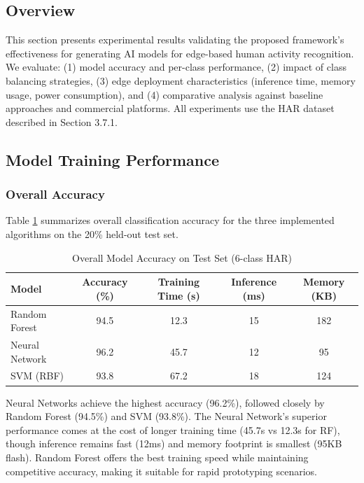 \subsection{Overview}
This section presents experimental results validating the proposed framework's effectiveness for generating AI models for edge-based human activity recognition. We evaluate: (1) model accuracy and per-class performance, (2) impact of class balancing strategies, (3) edge deployment characteristics (inference time, memory usage, power consumption), and (4) comparative analysis against baseline approaches and commercial platforms. All experiments use the HAR dataset described in Section 3.7.1.

\subsection{Model Training Performance}

\subsubsection{Overall Accuracy}
Table \ref{tab:model_accuracy} summarizes overall classification accuracy for the three implemented algorithms on the 20\% held-out test set.

\begin{table}[H]
    \centering
    \caption{Overall Model Accuracy on Test Set (6-class HAR)}
    \begin{tabular}{@{}lcccc@{}}
        \toprule
        Model & Accuracy (\%) & Training Time (s) & Inference (ms) & Memory (KB) \\ 
        \midrule
        Random Forest & 94.5 & 12.3 & 15 & 182 \\
        Neural Network & 96.2 & 45.7 & 12 & 95 \\
        SVM (RBF) & 93.8 & 67.2 & 18 & 124 \\ 
        \bottomrule
    \end{tabular}
    \label{tab:model_accuracy}
\end{table}

Neural Networks achieve the highest accuracy (96.2\%), followed closely by Random Forest (94.5\%) and SVM (93.8\%). The Neural Network's superior performance comes at the cost of longer training time (45.7s vs 12.3s for RF), though inference remains fast (12ms) and memory footprint is smallest (95KB flash). Random Forest offers the best training speed while maintaining competitive accuracy, making it suitable for rapid prototyping scenarios.

